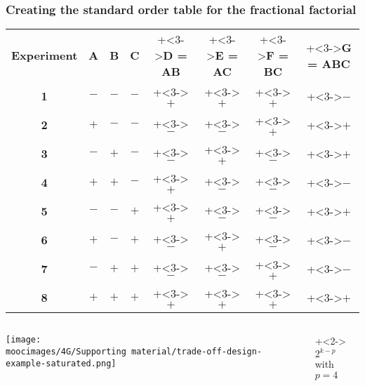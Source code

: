 \documentclass[handout,11pt,aspectratio=169,mathserif]{beamer}
\begin{document}
\begin{frame}\frametitle{Creating the standard order table for the fractional factorial}
	\vspace{0.4cm}
	\begin{tabulary}{\linewidth}{c|ccccccc}
		\textbf{\relax Experiment} & \textbf{\relax A } & \textbf{\relax B} & \textbf{\relax C } & \onslide+<3->{\textbf{\relax D = AB}} & \onslide+<3->{\textbf{\relax E = AC}} & \onslide+<3->{\textbf{\relax F = BC}} & \onslide+<3->{\textbf{\relax G = ABC}} \\ 
		\textbf{1} & \(-\) & \(-\) & \(-\) & \onslide+<3->{\(+\)} & \onslide+<3->{\(+\)} & \onslide+<3->{\(+\)} & \onslide+<3->{\(-\)} \\
		\textbf{2} & \(+\) & \(-\) & \(-\) & \onslide+<3->{\(-\)} & \onslide+<3->{\(-\)} & \onslide+<3->{\(+\)} & \onslide+<3->{\(+\)} \\
		\textbf{3} & \(-\) & \(+\) & \(-\) & \onslide+<3->{\(-\)} & \onslide+<3->{\(+\)} & \onslide+<3->{\(-\)} & \onslide+<3->{\(+\)} \\
		\textbf{4} & \(+\) & \(+\) & \(-\) & \onslide+<3->{\(+\)} & \onslide+<3->{\(-\)} & \onslide+<3->{\(-\)} & \onslide+<3->{\(-\)} \\
		\textbf{5} & \(-\) & \(-\) & \(+\) & \onslide+<3->{\(+\)} & \onslide+<3->{\(-\)} & \onslide+<3->{\(-\)} & \onslide+<3->{\(+\)} \\
		\textbf{6} & \(+\) & \(-\) & \(+\) & \onslide+<3->{\(-\)} & \onslide+<3->{\(+\)} & \onslide+<3->{\(-\)} & \onslide+<3->{\(-\)} \\
		\textbf{7} & \(-\) & \(+\) & \(+\) & \onslide+<3->{\(-\)} & \onslide+<3->{\(-\)} & \onslide+<3->{\(+\)} & \onslide+<3->{\(-\)} \\
		\textbf{8} & \(+\) & \(+\) & \(+\) & \onslide+<3->{\(+\)} & \onslide+<3->{\(+\)} & \onslide+<3->{\(+\)} & \onslide+<3->{\(+\)} \\  
	\end{tabulary}
	
	\vspace{0.4cm}
	
	
	\begin{columns}[T]
		
			\centerline{\texttt{[image: \\moocimages/4G/Supporting material/trade-off-design-example-saturated.png]}}
		
			\onslide+<2->{
				{\huge $2^{k-p}$\\
				{\normalsize with} $p=4$}
			}
	\end{columns}	
\end{frame}
\end{document}

